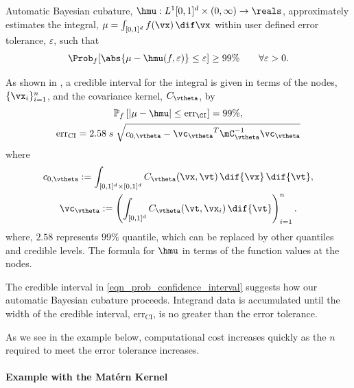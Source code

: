 Automatic Bayesian cubature, $\hmu: L^1[0,1]^d \times (0,\infty) \to \reals$, approximately estimates the integral, $\mu = \int_{[0,1]^d} f(\vx) \, \dif \vx$ within user defined error tolerance, $\varepsilon$, 
 such that 
\[
{\Prob_f  [ }\abs{ \mu - \hmu(f,\varepsilon)} \le \varepsilon 
{ ] \ge 99\%} \qquad \forall \varepsilon > 0.
\]

As shown in \cite{RatHic19a}, a credible interval for the integral is given in terms of the nodes, $\{\vx_i\}_{i=1}^n$, and the covariance kernel, $C_{\vtheta}$,  by 
\begin{subequations} \label{eqn_prob_confidence_interval}
\begin{gather}
\mathbb{P}_f \left[
|\mu-\hmu| \leq \text{err}_\CI
\right] = 99\%, \\
{\text{err}_{\text{CI}}} = 2.58 \; s \; \sqrt{c_{0,{\vtheta}} - {\vc_{\vtheta}}^T \mC_{\vtheta}^{-1}\vc_{\vtheta}}
\end{gather}
\end{subequations}
where
\begin{subequations} \label{eqn:fGaussDist}
\begin{gather}
\label{eqn:fGaussDist_c0}
	c_{0,{\vtheta}} := \int_{[0,1]^{d} \times [0,1]^{d}} C_{\vtheta} (\vx,\vt) \, \dif{\vx} \, \dif{\vt}, \\
	\label{eqn:fGaussDist_vc}
 \vc_{\vtheta} := \left(  \int_{[0,1]^d} C_{\vtheta} (\vt,\vx_i) \, \dif{\vt} \right)_{i=1}^n.
	\end{gather}
\end{subequations}
where, $2.58$ represents $99\%$ quantile, which can be replaced by other quantiles and credible levels.  The formula for $\hmu$ in terms of the function values at the nodes. %

The credible interval in \eqref{eqn_prob_confidence_interval} suggests how our automatic Bayesian cubature proceeds.  Integrand data is accumulated until the width of the credible interval, $\text{err}_{\text{CI}}$, is no greater than the error tolerance.  


As we see in the example below, computational cost increases quickly as the $n$ required to meet the error tolerance increases.  







\paragraph{Example with the Mat\'ern Kernel} \label{MVN_example}

